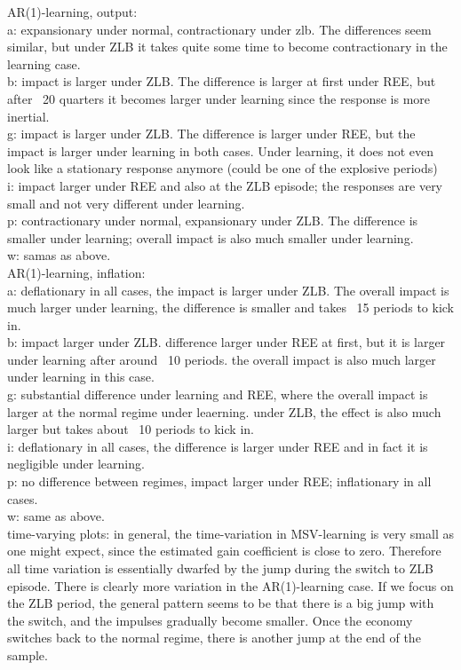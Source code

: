 \documentclass[12pt,reqno]{article}
\numberwithin{equation}{section}
\begin{document}
AR(1)-learning, output: \\
a: expansionary under normal, contractionary under zlb. The differences seem similar, but under ZLB it takes quite some time to become contractionary in the learning case. \\
b: impact is larger under ZLB. The difference is larger at first under REE, but after ~20 quarters it becomes larger under learning since the response is more inertial. \\
g: impact is larger under ZLB. The difference is larger under REE, but the impact is larger under learning in both cases. Under learning, it does not even look like a stationary response anymore (could be one of the explosive periods)\\
i: impact larger under REE and also at the ZLB episode; the responses are very small and not very different under learning. \\
p: contractionary under normal, expansionary under ZLB. The difference is smaller under learning; overall impact is also much smaller under learning. \\
w: samas as above. \\

AR(1)-learning, inflation: \\
a: deflationary in all cases, the impact is larger under ZLB. The overall impact is much larger under learning, the difference is smaller and takes ~15 periods to kick in. \\
b: impact larger under ZLB. difference larger under REE at first, but it is larger under learning after around ~10 periods. the overall impact is also much larger under learning in this case. \\
g: substantial difference under learning and REE, where the overall impact is larger at the normal regime under leaerning. under ZLB, the effect is also much larger but takes about ~10 periods to kick in. \\
i: deflationary in all cases, the difference is larger under REE and in fact it is negligible under learning. \\
p: no difference between regimes, impact larger under REE; inflationary in all cases. \\
w: same as above. \\

time-varying plots: in general, the time-variation in MSV-learning is very small as one might expect, since the estimated gain coefficient is close to zero. Therefore all time variation is essentially dwarfed by the jump during the switch to ZLB episode. There is clearly more variation in the AR(1)-learning case. If we focus on the ZLB period, the general pattern seems to be that there is a big jump with the switch, and the impulses gradually become smaller. Once the economy switches back to the normal regime, there is another jump at the end of the sample. \\
\end{document}
